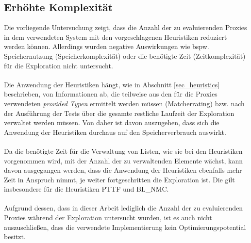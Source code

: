\subsection{Erhöhte Komplexität}
Die vorliegende Untersuchung zeigt, dass die Anzahl der zu evaluierenden Proxies in dem verwendeten System mit den vorgeschlagenen Heuristiken reduziert werden können. Allerdings wurden negative Auswirkungen wie bspw. Speichernutzung (Speicherkomplexität) oder die benötigte Zeit (Zeitkomplexität) für die Exploration nicht untersucht.
\\\\
Die Anwendung der Heuristiken hängt, wie in Abschnitt \ref{sec_heuristics} beschrieben, von Informationen ab, die teilweise aus den für die Proxies verwendeten \emph{provided Typen} ermittelt werden müssen (Matcherrating) bzw. nach der Ausführung der Tests über die gesamte restliche Laufzeit der Exploration verwaltet werden müssen. Von daher ist davon auszugehen, dass sich die Anwendung der Heuristiken durchaus auf den Speicherverbrauch auswirkt.
\\\\
Da die benötigte Zeit für die Verwaltung von Listen, wie sie bei den Heuristiken vorgenommen wird, mit der Anzahl der zu verwaltenden Elemente wächst, kann davon ausgegangen werden, dass die Anwendung der Heuristiken ebenfalls mehr Zeit in Anspruch nimmt, je weiter fortgeschritten die Exploration ist. Die gilt insbesondere für die Heuristiken PTTF und BL\_NMC. 
\\\\
Aufgrund dessen, dass in dieser Arbeit lediglich die Anzahl der zu evaluierenden Proxies während der Exploration untersucht wurden, ist es auch nicht auszuschließen, dass die verwendete Implementierung kein Optimierungspotential besitzt.

